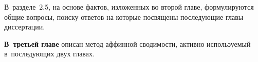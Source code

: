 В~разделе~2.5, на основе фактов, изложенных во второй главе,
формулируются общие вопросы, поиску ответов на которые посвящены последующие главы диссертации.
\begin{comment}
А именно, из~перечисленных фактов следует, что многогранники NP"~трудных задач во многих случаях обладают схожими свойствами. Например: NP"~полнота задачи распознавания несмежности вершин, небольшой диаметр графа, сверхполиномиальное кликовое число графа, сверхполиномиальные сложность расширения и~число прямоугольного покрытия матрицы инциденций вершин"=гиперграней.
Часто эти сходства обусловлены тесными связями геометрического характера, обнаруживаемыми в~разное время разными исследователями, когда многогранники одной задачи аффинно эквивалентны или являются проекциями некоторых граней многогранников другой задачи.
В~связи с~этим естественными являются следующие вопросы общего характера. 
Можно ли систематически использовать такой способ сравнения для различных семейств многогранников? 
Какие выводы на основе сравнений такого типа можно сделать в~отношении различных комбинаторно"=геометрических характеристик многогранников?
Ответы на эти вопросы содержатся в~главах 3--5.
Для каждой из~рассмотренных во второй главе характеристик также естественно задать следующий вопрос.
Есть ли связь между данной характеристикой многогранника и~сложностью соответствующей оптимизационной задачи?
В~связи с~этим возникают и~вопросы более общего характера.
Какие известные в~настоящее время комбинаторно"=геометрические характеристики многогранника наиболее адекватно отражают сложность соответствующей задачи?
Есть ли связь между комбинаторным типом многогранника и~сложностью задачи оптимизации на нем?
Исследованию этих проблем посвящены главы 7 и~8.
\end{comment}



\textbf{В~третьей главе} описан метод аффинной сводимости, активно используемый в~последующих двух главах.

